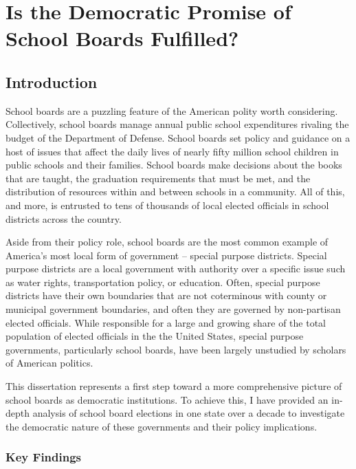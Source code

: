 \chapter{Is the Democratic Promise of School Boards Fulfilled?}
\label{chap:conclusion}

\section{Introduction}

School boards are a puzzling feature of the American polity worth considering. 
Collectively, school boards manage annual public school expenditures rivaling the 
budget of the Department of Defense. School boards set policy and guidance on a 
host of issues that affect the daily lives of nearly fifty million school children 
in public schools and their families. School boards make decisions about the 
books that are taught, the graduation requirements that must be met, and the 
distribution of resources within and between schools in a community. All of this, 
and more, is entrusted to tens of thousands of local elected officials in school 
districts across the country. 

Aside from their policy role, school boards are the most common example of America's 
most local form of government -- special purpose districts. Special purpose districts 
are a local government with authority over a specific issue such as water rights, 
transportation policy, or education. Often, special purpose districts have their 
own boundaries that are not coterminous with county or municipal government 
boundaries, and often they are governed by non-partisan elected officials. While 
responsible for a large and growing share of the total population of elected officials 
in the the United States, special purpose governments, particularly school boards, 
have been largely unstudied by scholars of American politics. 

This dissertation represents a first step toward a more comprehensive picture of 
school boards as democratic institutions. To achieve this, I have provided an in-depth
analysis of school board elections in one state over a decade to investigate the 
democratic nature of these governments and their policy implications. 

\subsection{Key Findings}

